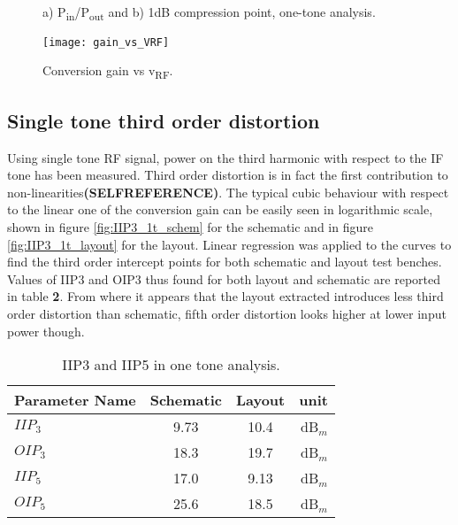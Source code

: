 \begin{figure}[H] 
	\centering
	 \\
	\caption{a) P\textsubscript{in}/P\textsubscript{out} and  b) 1dB compression point, one-tone analysis.}
	\label{fig:PinPout1T_1dBCp}
\end{figure}


\begin{figure}[H]
	\centering
	\texttt{[image: gain\_vs\_VRF]}
	\caption{Conversion gain vs v\textsubscript{RF}.}
	\label{fig:GainvsRF}
\end{figure}


\subsection{Single tone third order distortion}
Using single tone RF signal, power on the third harmonic with respect to the IF tone has been measured. Third order distortion is in fact the first contribution to non-linearities\textbf{(SELFREFERENCE)}. 
The typical cubic behaviour with respect to the linear one of the conversion gain can be easily seen in logarithmic scale, shown in figure \ref{fig:IIP3_1t_schem} for the schematic and in figure \ref{fig:IIP3_1t_layout} for the layout. 
Linear regression was applied to the curves to find the third order intercept points for both schematic and layout test benches. Values of IIP3 and OIP3 thus found for both layout and schematic are reported in table \textbf{2}. From where it appears that the layout extracted introduces less third order distortion than schematic, fifth order distortion looks higher at lower input power though.
\begin{table} [H]
	\label{tab:IIP3_1tone}
	\caption{IIP3 and IIP5 in one tone analysis.}
	\centering	
	\begin{tabular}{lccr} 
		\toprule 
		Parameter Name			& Schematic 	& Layout & unit \\ 
		\midrule
		\(IIP_{3}\)  & 9.73 & 10.4 & dB\(_{m}\) \\
		\(OIP_{3}\)  & 18.3 &19.7 & dB\(_{m}\) \\
		\(IIP_{5}\)  & 17.0 &9.13 & dB\(_{m}\) \\
		\(OIP_{5}\)  & 25.6 &18.5 & dB\(_{m}\) \\
		\bottomrule 
	\end{tabular}	
\end{table}


